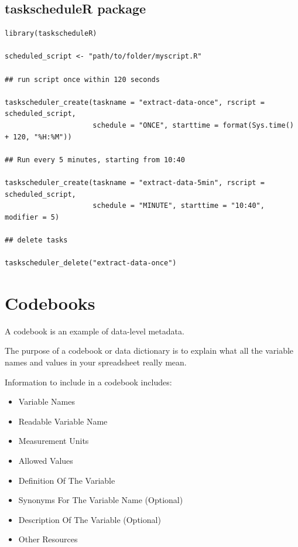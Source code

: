 \documentclass[
  letterpaper,
  DIV=11,
  numbers=noendperiod]{scrreprt}
\providecommand{\tightlist}{%
  \setlength{\itemsep}{0pt}\setlength{\parskip}{0pt}}\usepackage{longtable,booktabs,array}
\begin{document}
\hypertarget{taskscheduler-package}{%
\section*{taskscheduleR package}\label{taskscheduler-package}}


\begin{verbatim}
library(taskscheduleR)

scheduled_script <- "path/to/folder/myscript.R"

## run script once within 120 seconds

taskscheduler_create(taskname = "extract-data-once", rscript = scheduled_script,
                     schedule = "ONCE", starttime = format(Sys.time() + 120, "%H:%M"))

## Run every 5 minutes, starting from 10:40

taskscheduler_create(taskname = "extract-data-5min", rscript = scheduled_script,
                     schedule = "MINUTE", starttime = "10:40", modifier = 5)

## delete tasks

taskscheduler_delete("extract-data-once")
\end{verbatim}


\hypertarget{codebooks}{%
\chapter*{Codebooks}\label{codebooks}}


A codebook is an example of data-level metadata.

The purpose of a codebook or data dictionary is to explain what all the
variable names and values in your spreadsheet really mean.

Information to include in a codebook includes:

\begin{itemize}
\tightlist
\item
  Variable Names
\item
  Readable Variable Name
\item
  Measurement Units
\item
  Allowed Values
\item
  Definition Of The Variable
\item
  Synonyms For The Variable Name (Optional)
\item
  Description Of The Variable (Optional)
\item
  Other Resources
\end{itemize}
\end{document}
